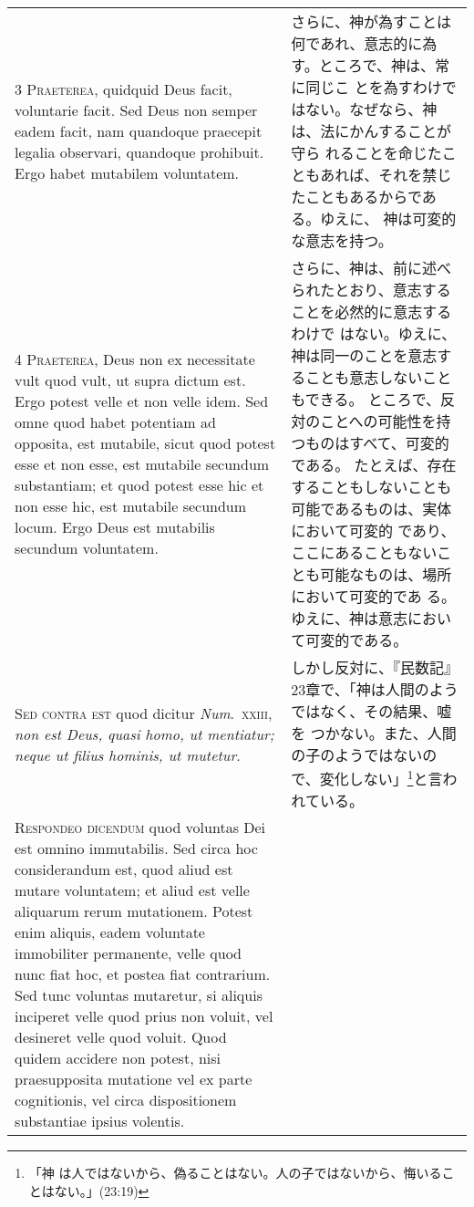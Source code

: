 \documentclass[10pt]{jsarticle} %
\begin{document}
\begin{longtable}{p{21em}p{21em}}
\\



{\scshape 3 Praeterea}, quidquid Deus facit, voluntarie
 facit. Sed Deus non semper eadem facit, nam quandoque praecepit legalia
 observari, quandoque prohibuit. Ergo habet mutabilem voluntatem.


&

さらに、神が為すことは何であれ、意志的に為す。ところで、神は、常に同じこ
 とを為すわけではない。なぜなら、神は、法にかんすることが守ら
 れることを命じたこともあれば、それを禁じたこともあるからである。ゆえに、
 神は可変的な意志を持つ。


\\



{\scshape 4 Praeterea}, Deus non ex necessitate vult
 quod vult, ut supra dictum est. Ergo potest velle et non velle
 idem. Sed omne quod habet potentiam ad opposita, est mutabile, sicut
 quod potest esse et non esse, est mutabile secundum substantiam; et
 quod potest esse hic et non esse hic, est mutabile secundum locum. Ergo
 Deus est mutabilis secundum voluntatem.


&

さらに、神は、前に述べられたとおり、意志することを必然的に意志するわけで
 はない。ゆえに、神は同一のことを意志することも意志しないこともできる。
ところで、反対のことへの可能性を持つものはすべて、可変的である。
たとえば、存在することもしないことも可能であるものは、実体において可変的
 であり、ここにあることもないことも可能なものは、場所において可変的であ
 る。ゆえに、神は意志において可変的である。


\\



{\scshape  Sed contra est} quod dicitur {\itshape Num}.~{\scshape xxiii}, {\itshape non est Deus, quasi homo, ut mentiatur; neque ut filius hominis, ut
 mutetur}.


&

しかし反対に、『民数記』23章で、「神は人間のようではなく、その結果、嘘を
 つかない。また、人間の子のようではないので、変化しない」\footnote{「神
 は人ではないから、偽ることはない。人の子ではないから、悔いることはない。」(23:19)}と言われている。


\\



{\scshape Respondeo dicendum} quod voluntas Dei est
 omnino immutabilis. Sed circa hoc considerandum est, quod aliud est
 mutare voluntatem; et aliud est velle aliquarum rerum
 mutationem. Potest enim aliquis, eadem voluntate immobiliter
 permanente, velle quod nunc fiat hoc, et postea fiat contrarium. Sed
 tunc voluntas mutaretur, si aliquis inciperet velle quod prius non
 voluit, vel desineret velle quod voluit. Quod quidem accidere non
 potest, nisi praesupposita mutatione vel ex parte cognitionis, vel
 circa dispositionem substantiae ipsius volentis. 



\end{longtable}
\end{document}
